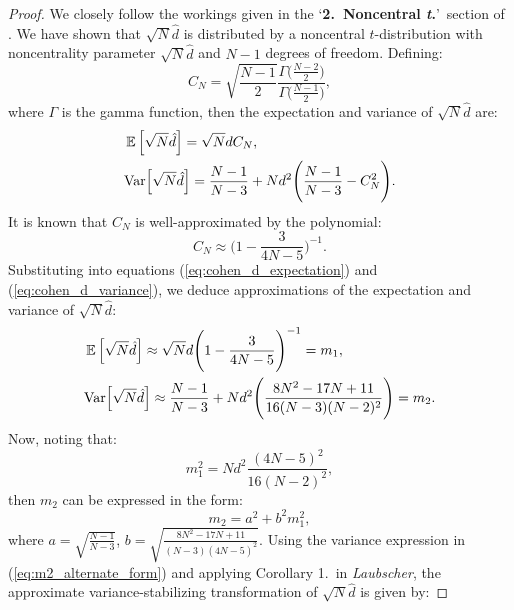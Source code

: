 \begin{proof}
We closely follow the workings given in the `\textbf{2.\ Noncentral \textit{t}.}'\ section of \textit{\citet*{Laubscher1960-px}}. We have shown that $\sqrt{N}\hat{d}$ is distributed by a noncentral $t$-distribution with noncentrality parameter $\sqrt{N}{\hat{d}}$ and $N - 1$ degrees of freedom. Defining:
\begin{equation}
\label{eq:Cn}
C_{N} = \sqrt{\frac{N-1}{2}} \frac{\Gamma\Big(\frac{N-2}{2}\Big)}{\Gamma\Big(\frac{N-1}{2}\Big)},
\end{equation}
where $\Gamma$ is the gamma function, then the expectation and variance of $\sqrt{N}\hat{d}$ are:
\begin{align}
& \operatorname*{\mathbb{E}}\Big[\sqrt{N}\hat{d}\Big] = \sqrt{N}dC_{N}, \label{eq:cohen_d_expectation}\\
& \mathrm{Var}\Big[\sqrt{N}\hat{d}\Big] =  \frac{N-1}{N-3} + Nd^{2} \Bigg(\frac{N-1}{N-3} - C_{N}^{2} \Bigg). \label{eq:cohen_d_variance}
\end{align}
It is known that $C_{N}$ is well-approximated by the polynomial:
\begin{equation}
\label{eq:Cn_approximation}
C_{N} \approx \Bigg(1 - \frac{3}{4N - 5} \Bigg)^{-1}.
\end{equation}
Substituting into equations (\ref{eq:cohen_d_expectation}) and (\ref{eq:cohen_d_variance}), we deduce approximations of the expectation and variance of $\sqrt{N}\hat{d}$: 
\begin{align}
&  \operatorname*{\mathbb{E}}\Big[\sqrt{N}\hat{d}\Big] \approx \sqrt{N}d \Bigg(1 - \frac{3}{4N - 5}\Bigg)^{-1} = m_{1}, \label{eq:cohen_d_expectation_approximation}\\
& \mathrm{Var}\Big[\sqrt{N}\hat{d}\Big] \approx  \frac{N-1}{N-3} + N d^{2} \Bigg(\frac{8N^{2} - 17N + 11}{16(N-3)(N-2)^{2}} \Bigg) =  m_{2}. \label{eq:cohen_d_variance_approximation}
\end{align}
Now, noting that: 
\begin{equation}
\label{eq:m1_squared}
m_{1}^{2} = N d^{2} \frac{(4N -5)^{2}}{16(N-2)^{2}},
\end{equation}
then $m_{2}$ can be expressed in the form:
\begin{equation}
\label{eq:m2_alternate_form}
m_{2} = a^{2} + b^{2} m_{1}^{2},
\end{equation}
where $a = \sqrt{\frac{N-1}{N-3}}$, $b = \sqrt{\frac{8N^{2}-17N + 11}{(N-3)(4N-5)^{2}}}$.
Using the variance expression in (\ref{eq:m2_alternate_form}) and applying Corollary 1.\  in \textit{Laubscher}, the approximate variance-stabilizing transformation of $\sqrt{N}\hat{d}$ is given by: 

\end{proof}
